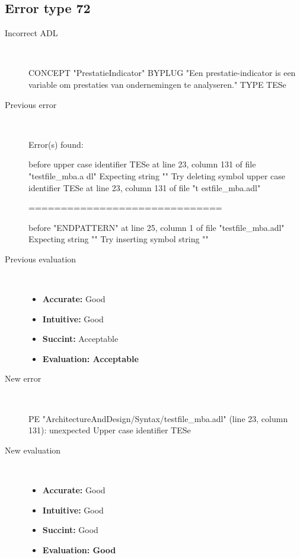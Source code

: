 \subsection{Error type 72}
  \begin{description}
  \item[Incorrect ADL]~\\
\begin{adl}
CONCEPT "PrestatieIndicator" BYPLUG "Een prestatie-indicator is een variable om prestaties van ondernemingen te analyseren." TYPE TESe\end{adl}
  \item[Previous error]~\\
\begin{haskell}
Error(s) found:

before upper case identifier TESe at line 23, column 131 of file "testfile_mba.a
dl"
Expecting string ""
Try deleting symbol upper case identifier TESe at line 23, column 131 of file "t
estfile_mba.adl"

==============================

before "ENDPATTERN" at line 25, column 1 of file "testfile_mba.adl"
Expecting string ""
Try inserting symbol string ""
\end{haskell}
  \item[Previous evaluation]~\\
    \begin{itemize}
    \item \textbf{Accurate:} Good
    \item \textbf{Intuitive:} Good
    \item \textbf{Succint:} Acceptable
    \item \textbf{Evaluation: Acceptable}
    \end{itemize}
  \item[New error]~\\
\begin{haskell}
PE "ArchitectureAndDesign/Syntax/testfile_mba.adl" (line 23, column 131):
unexpected Upper case identifier TESe\end{haskell}
  \item[New evaluation]~\\
    \begin{itemize}
    \item \textbf{Accurate:} Good
    \item \textbf{Intuitive:} Good
    \item \textbf{Succint:} Good
    \item \textbf{Evaluation: Good
}
    \end{itemize}
  \end{description}

